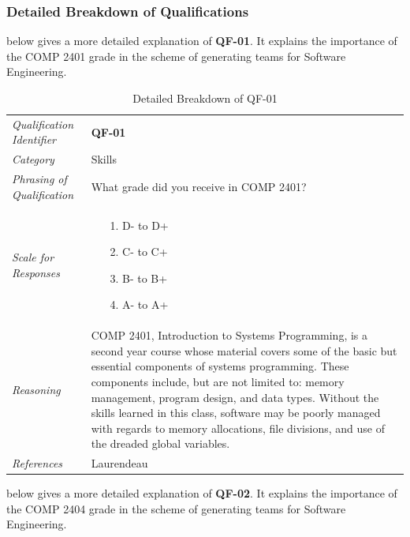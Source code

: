 \documentclass[12pt,letterpaper]{article}
\begin{document}
\subsubsection{Detailed Breakdown of Qualifications}

 below gives a more detailed explanation of {\bf QF-01}. It explains the importance of the COMP 2401 grade in the scheme of generating teams for Software Engineering.

\begin{table}[H]
	\caption{Detailed Breakdown of QF-01}
	\begin{tabu} to 
		\toprule
		Qualification Identifier & {\bf QF-01}\\
		Category & Skills \\
		Phrasing of Qualification & What grade did you receive in COMP 2401? \\
		Scale for Responses &
		\begin{minipage}[t]{\linewidth}
			\begin{enumerate}
				\item[1.] D- to D+
				\item[2.] C- to C+
				\item[3.] B- to B+
				\item[4.] A- to A+
			\end{enumerate}
		\end{minipage}\\
		Reasoning & COMP 2401, Introduction to Systems Programming, is a second year course whose material covers some of the basic but essential components of systems programming. These components include, but are not limited to: memory management, program design, and data types. Without the skills learned in this class, software may be poorly managed with regards to memory allocations, file divisions, and use of the dreaded global variables.\\
		References & Laurendeau\cite{claurend1}\\
		\toprule
	\end{tabu}
\end{table}

 below gives a more detailed explanation of {\bf QF-02}. It explains the importance of the COMP 2404 grade in the scheme of generating teams for Software Engineering.
\end{document}
